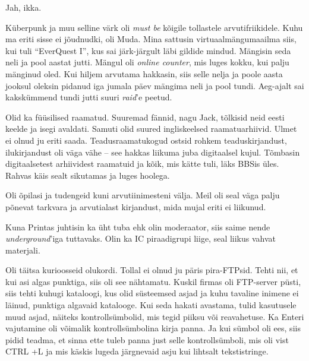 
Jah, ikka.

Küberpunk ja muu selline värk oli \emph{must be} kõigile tollastele
arvuti{\-}friikidele. Kuhu ma eriti 
sisse ei jõudnudki, oli Muda. Mina sattusin virtuaalmängumaailma 
siis, kui tuli \enquote{EverQuest I}, kus sai 
järk-järgult läbi gildide mindud. Mängisin seda neli ja pool aastat jutti. 
Mängul oli \emph{online counter}, mis luges kokku, kui palju mänginud oled. Kui hiljem arvutama hakkasin, siis selle nelja ja poole aasta jooksul oleksin pidanud iga jumala 
päev mängima neli ja pool tundi. Aeg-ajalt sai 
kakskümmend tundi jutti suuri \emph{raid}'e peetud.


Olid ka füüsilised raamatud. Suuremad fännid, nagu Jack, tõlkisid neid eesti keelde ja isegi 
avaldati. Samuti olid suured ingliskeelsed raamatuarhiivid. Ulmet ei olnud ju eriti saada. Teadusraamatukogud ostsid rohkem 
teaduskirjandust, ilukirjandust oli väga vähe -- see hakkas liikuma 
juba digitaalsel kujul. Tõmbasin digitaalsetest arhiividest raamatuid ja kõik, mis kätte tuli, läks
BBSis üles. Rahvas käis sealt
sikutamas ja luges hoolega. 


Oli õpilasi ja tudengeid kuni arvutiinimesteni välja. Meil 
oli seal väga palju põnevat tarkvara ja arvutialast kirjandust, mida mujal eriti ei liikunud. 

Kuna Printas juhtisin ka üht tuba ehk olin moderaator, siis saime nende 
\emph{underground}'iga tuttavaks. Olin ka IC piraadigrupi liige, 
seal liikus vahvat materjali. 

Oli täitsa kurioosseid olukordi. Tollal 
ei olnud ju päris pira-FTPsid. Tehti nii, et kui asi algas 
punktiga, siis oli see nähtamatu. Kuskil firmas oli FTP-server püsti, 
siis tehti kuhugi kataloogi, kus olid süsteemsed asjad ja 
kuhu tavaline inimene ei läinud, punktiga algavaid katalooge. Kui seda 
hakati avastama, tulid kasutusele muud asjad, näiteks 
kontrollsümbolid, mis tegid piiksu või reavahetuse. 
Ka Enteri vajutamine oli võimalik 
kontrollsümbolina kirja panna. Ja kui sümbol oli ees, siis pidid 
teadma, et sinna ette tuleb panna just selle kontrollsümboli, mis oli vist CTRL +L ja mis 
käskis lugeda järgnevaid asju kui lihtsalt tekstistringe.

